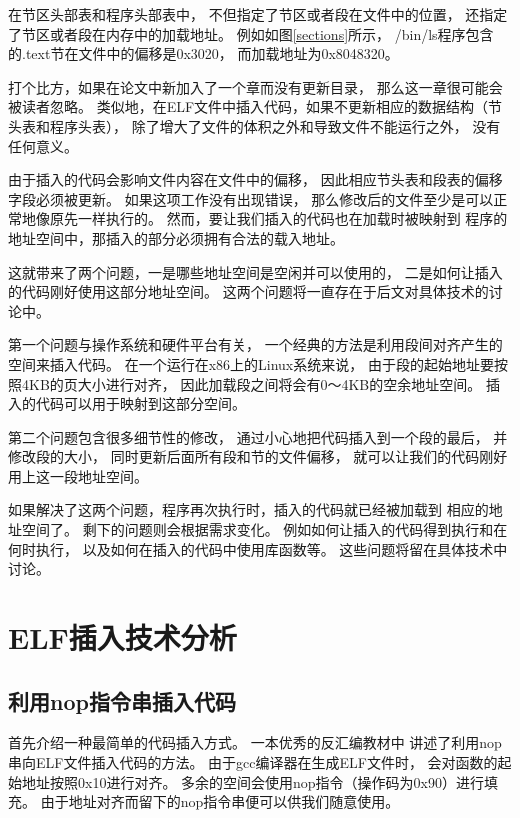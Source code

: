 在节区头部表和程序头部表中，
不但指定了节区或者段在文件中的位置，
还指定了节区或者段在内存中的加载地址。
例如如图\ref{sections}所示，
/bin/ls程序包含的.text节在文件中的偏移是0x3020，
而加载地址为0x8048320。

打个比方，如果在论文中新加入了一个章而没有更新目录，
那么这一章很可能会被读者忽略。
类似地，在ELF文件中插入代码，如果不更新相应的数据结构（节头表和程序头表），
除了增大了文件的体积之外和导致文件不能运行之外，
没有任何意义。

由于插入的代码会影响文件内容在文件中的偏移，
因此相应节头表和段表的偏移字段必须被更新。
如果这项工作没有出现错误，
那么修改后的文件至少是可以正常地像原先一样执行的。
然而，要让我们插入的代码也在加载时被映射到
程序的地址空间中，那插入的部分必须拥有合法的载入地址。

这就带来了两个问题，一是哪些地址空间是空闲并可以使用的，
二是如何让插入的代码刚好使用这部分地址空间。
这两个问题将一直存在于后文对具体技术的讨论中。

第一个问题与操作系统和硬件平台有关，
一个经典的方法是利用段间对齐产生的空间来插入代码。
在一个运行在x86上的Linux系统来说，
由于段的起始地址要按照4KB的页大小进行对齐，
因此加载段之间将会有0～4KB的空余地址空间。
插入的代码可以用于映射到这部分空间。

第二个问题包含很多细节性的修改，
通过小心地把代码插入到一个段的最后，
并修改段的大小，
同时更新后面所有段和节的文件偏移，
就可以让我们的代码刚好用上这一段地址空间。

如果解决了这两个问题，程序再次执行时，插入的代码就已经被加载到
相应的地址空间了。
剩下的问题则会根据需求变化。
例如如何让插入的代码得到执行和在何时执行，
以及如何在插入的代码中使用库函数等。
这些问题将留在具体技术中讨论。



\section{ELF插入技术分析}


\subsection{利用nop指令串插入代码}
\label{nopinjection}

首先介绍一种最简单的代码插入方式。
一本优秀的反汇编教材\cite{heike}中
讲述了利用nop串向ELF文件插入代码的方法。
由于gcc编译器在生成ELF文件时，
会对函数的起始地址按照0x10进行对齐。
多余的空间会使用nop指令（操作码为0x90）进行填充。
由于地址对齐而留下的nop指令串便可以供我们随意使用。

